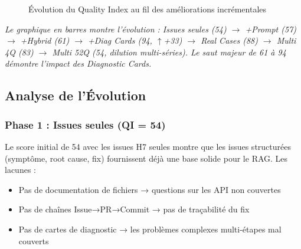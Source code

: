 \begin{figure}[H]
\centering
{}
\caption{Évolution du Quality Index au fil des améliorations incrémentales}
\label{fig:qi_config_evolution}
\end{figure}

\textit{Le graphique en barres montre l'évolution : Issues seules (54) $\to$ +Prompt (57) $\to$ +Hybrid (61) $\to$ +Diag Cards (94, $\uparrow$+33) $\to$ Real Cases (88) $\to$ Multi 4Q (83) $\to$ Multi 52Q (54, dilution multi-séries). Le saut majeur de 61 à 94 démontre l'impact des Diagnostic Cards.}

\subsection{Analyse de l'Évolution}

\subsubsection{Phase 1 : Issues seules (QI = 54)}

Le score initial de 54 avec les issues H7 seules montre que les issues structurées (symptôme, root cause, fix) fournissent déjà une base solide pour le RAG. Les lacunes :
\begin{itemize}
  \item Pas de documentation de fichiers → questions sur les API non couvertes
  \item Pas de chaînes Issue→PR→Commit → pas de traçabilité du fix
  \item Pas de cartes de diagnostic → les problèmes complexes multi-étapes mal couverts
\end{itemize}

